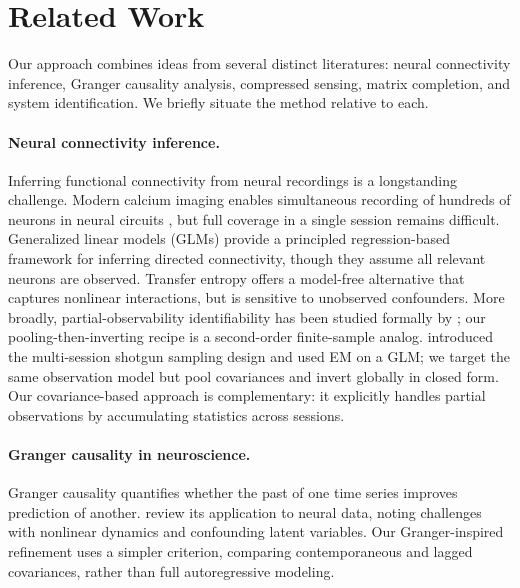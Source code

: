 \documentclass{article}
\begin{document}
\section{Related Work}
\label{sec:related}

Our approach combines ideas from several distinct literatures: neural connectivity inference, Granger causality analysis, compressed sensing, matrix completion, and system identification. We briefly situate the method relative to each.

\paragraph{Neural connectivity inference.}
Inferring functional connectivity from neural recordings is a longstanding challenge.
Modern calcium imaging enables simultaneous recording of hundreds of neurons in neural circuits \citep{kato2015global, yemini2021neuropal}, but full coverage in a single session remains difficult.
Generalized linear models (GLMs) \citep{pillow2008spatio} provide a principled regression-based framework for inferring directed connectivity, though they assume all relevant neurons are observed.
Transfer entropy \citep{schreiber2000measuring} offers a model-free alternative that captures nonlinear interactions, but is sensitive to unobserved confounders.
More broadly, partial-observability identifiability has been studied formally by \citet{janzing2010causal}; our pooling-then-inverting recipe is a second-order finite-sample analog.
\citet{soudry2015shotgun} introduced the multi-session shotgun sampling design and used EM on a GLM; we target the same observation model but pool covariances and invert globally in closed form.
Our covariance-based approach is complementary: it explicitly handles partial observations by accumulating statistics across sessions.

\paragraph{Granger causality in neuroscience.}
Granger causality \citep{granger1969investigating} quantifies whether the past of one time series improves prediction of another.
\citet{seth2015granger} review its application to neural data, noting challenges with nonlinear dynamics and confounding latent variables.
Our Granger-inspired refinement uses a simpler criterion, comparing contemporaneous and lagged covariances, rather than full autoregressive modeling.
\end{document}
